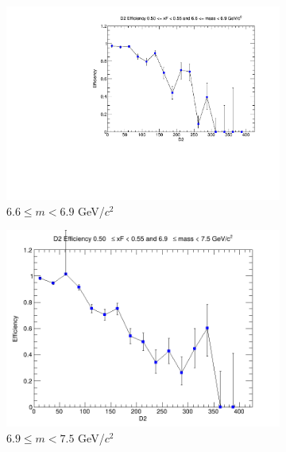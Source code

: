 \begin{figure}[p]
\begin{subfigure}[b]{0.32\textwidth}
        \includegraphics[width=\textwidth]{./kTrackerEfficiencyPlots/D2_Efficiency_xF10_mass8.pdf}
        \caption{$6.6 \leq m < 6.9$ GeV/$c^2$}
        \label{fig:xF10_mass8}
    \end{subfigure}
    \vspace{0.5cm}
    \begin{subfigure}[b]{0.32\textwidth}
        \centering
        \includegraphics[width=\textwidth]{./kTrackerEfficiencyPlots/D2_Efficiency_xF10_mass9.png}
        \caption{$6.9 \leq m < 7.5$ GeV/$c^2$}
        \label{fig:xF10_mass9}
    \end{subfigure}
    \hfill
    \begin{subfigure}[b]{0.32\textwidth}
        \centering

\end{subfigure}
\end{figure}
